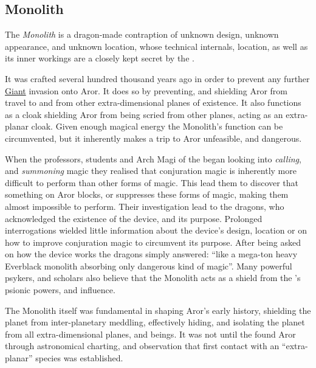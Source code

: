 \subsection{Monolith}
\label{sec:Monolith}

The \emph{Monolith} is a dragon-made contraption of unknown design, unknown
appearance, and unknown location, whose technical internals, location, as well
as its inner workings are a closely kept secret by the .

It was crafted several hundred thousand years ago in order to prevent any
further \hyperref[sec:Giants]{Giant} invasion onto Aror. It does so by
preventing, and shielding Aror from travel to and from other extra-dimensional
planes of existence. It also functions as a cloak shielding Aror from being
scried from other planes, acting as an extra-planar cloak. Given enough
magical energy the Monolith's function can be circumvented, but it inherently
makes a trip to Aror unfeasible, and dangerous.

When the professors, students and Arch Magi of the  began looking into \emph{calling}, and \emph{summoning} magic
they realised that conjuration magic is inherently more difficult to perform
than other forms of magic. This lead them to discover that something on Aror
blocks, or suppresses these forms of magic, making them almost impossible to
perform. Their investigation lead to the dragons, who acknowledged the
existence of the device, and its purpose. Prolonged interrogations wielded
little information about the device's design, location or on how to improve
conjuration magic to circumvent its purpose. After being asked on how the
device works the dragons simply answered: ``like a mega-ton heavy Everblack
monolith absorbing only dangerous kind of magic''. Many powerful psykers, and
scholars also believe that the Monolith acts as a shield from the
's psionic powers, and influence.

The Monolith itself was fundamental in shaping Aror's early history, shielding
the planet from inter-planetary meddling, effectively hiding, and isolating the
planet from all extra-dimensional planes, and beings. It was not until the
 found Aror through astronomical charting, and observation
that first contact with an ``extra-planar'' species was established.

